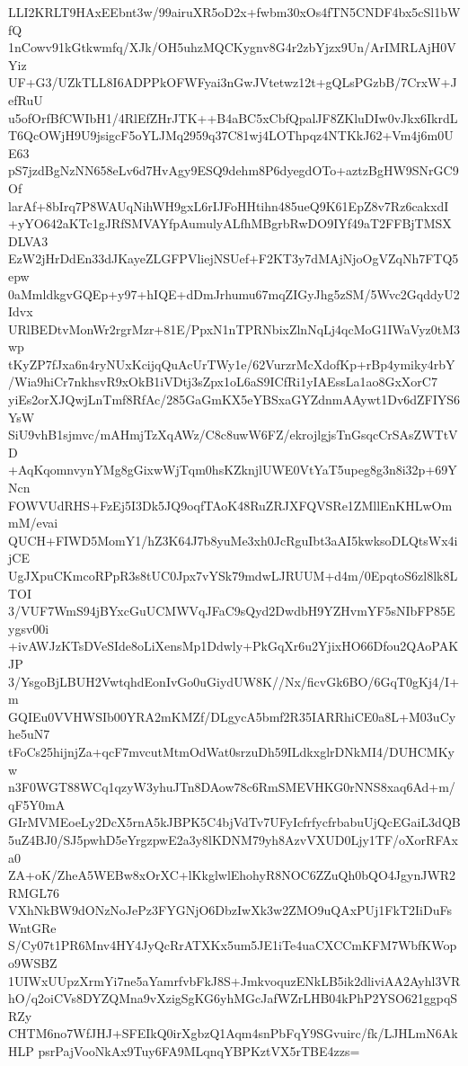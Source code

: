 LLI2KRLT9HAxEEbnt3w/99airuXR5oD2x+fwbm30xOs4fTN5CNDF4bx5cSl1bWfQ
1nCowv91kGtkwmfq/XJk/OH5uhzMQCKygnv8G4r2zbYjzx9Un/ArIMRLAjH0VYiz
UF+G3/UZkTLL8I6ADPPkOFWFyai3nGwJVtetwz12t+gQLsPGzbB/7CrxW+JefRuU
u5ofOrfBfCWIbH1/4RlEfZHrJTK++B4aBC5xCbfQpalJF8ZKluDIw0vJkx6IkrdL
T6QcOWjH9U9jsigcF5oYLJMq2959q37C81wj4LOThpqz4NTKkJ62+Vm4j6m0UE63
pS7jzdBgNzNN658eLv6d7HvAgy9ESQ9dehm8P6dyegdOTo+aztzBgHW9SNrGC9Of
larAf+8bIrq7P8WAUqNihWH9gxL6rIJFoHHtihn485ueQ9K61EpZ8v7Rz6cakxdI
+yYO642aKTc1gJRfSMVAYfpAumulyALfhMBgrbRwDO9IYf49aT2FFBjTMSXDLVA3
EzW2jHrDdEn33dJKayeZLGFPVliejNSUef+F2KT3y7dMAjNjoOgVZqNh7FTQ5epw
0aMmldkgvGQEp+y97+hIQE+dDmJrhumu67mqZIGyJhg5zSM/5Wvc2GqddyU2Idvx
URlBEDtvMonWr2rgrMzr+81E/PpxN1nTPRNbixZlnNqLj4qcMoG1IWaVyz0tM3wp
tKyZP7fJxa6n4ryNUxKcijqQuAcUrTWy1e/62VurzrMcXdofKp+rBp4ymiky4rbY
/Wia9hiCr7nkhsvR9xOkB1iVDtj3sZpx1oL6aS9ICfRi1yIAEssLa1ao8GxXorC7
yiEs2orXJQwjLnTmf8RfAc/285GaGmKX5eYBSxaGYZdnmAAywt1Dv6dZFIYS6YsW
SiU9vhB1sjmvc/mAHmjTzXqAWz/C8c8uwW6FZ/ekrojlgjsTnGsqcCrSAsZWTtVD
+AqKqomnvynYMg8gGixwWjTqm0hsKZknjlUWE0VtYaT5upeg8g3n8i32p+69YNcn
FOWVUdRHS+FzEj5I3Dk5JQ9oqfTAoK48RuZRJXFQVSRe1ZMllEnKHLwOmmM/evai
QUCH+FIWD5MomY1/hZ3K64J7b8yuMe3xh0JcRguIbt3aAI5kwksoDLQtsWx4ijCE
UgJXpuCKmcoRPpR3s8tUC0Jpx7vYSk79mdwLJRUUM+d4m/0EpqtoS6zl8lk8LTOI
3/VUF7WmS94jBYxcGuUCMWVqJFaC9sQyd2DwdbH9YZHvmYF5sNIbFP85Eygsv00i
+ivAWJzKTsDVeSIde8oLiXensMp1Ddwly+PkGqXr6u2YjixHO66Dfou2QAoPAKJP
3/YsgoBjLBUH2VwtqhdEonIvGo0uGiydUW8K//Nx/ficvGk6BO/6GqT0gKj4/I+m
GQIEu0VVHWSIb00YRA2mKMZf/DLgycA5bmf2R35IARRhiCE0a8L+M03uCyhe5uN7
tFoCs25hijnjZa+qcF7mvcutMtmOdWat0srzuDh59ILdkxglrDNkMI4/DUHCMKyw
n3F0WGT88WCq1qzyW3yhuJTn8DAow78c6RmSMEVHKG0rNNS8xaq6Ad+m/qF5Y0mA
GIrMVMEoeLy2DcX5rnA5kJBPK5C4bjVdTv7UFyIcfrfycfrbabuUjQcEGaiL3dQB
5uZ4BJ0/SJ5pwhD5eYrgzpwE2a3y8lKDNM79yh8AzvVXUD0Ljy1TF/oXorRFAxa0
ZA+oK/ZheA5WEBw8xOrXC+lKkglwlEhohyR8NOC6ZZuQh0bQO4JgynJWR2RMGL76
VXhNkBW9dONzNoJePz3FYGNjO6DbzIwXk3w2ZMO9uQAxPUj1FkT2IiDuFsWntGRe
S/Cy07t1PR6Mnv4HY4JyQcRrATXKx5um5JE1iTe4uaCXCCmKFM7WbfKWopo9WSBZ
1UIWxUUpzXrmYi7ne5aYamrfvbFkJ8S+JmkvoquzENkLB5ik2dliviAA2Ayhl3VR
hO/q2oiCVs8DYZQMna9vXzigSgKG6yhMGcJafWZrLHB04kPhP2YSO621ggpqSRZy
CHTM6no7WfJHJ+SFEIkQ0irXgbzQ1Aqm4snPbFqY9SGvuirc/fk/LJHLmN6AkHLP
psrPajVooNkAx9Tuy6FA9MLqnqYBPKztVX5rTBE4zzs=
